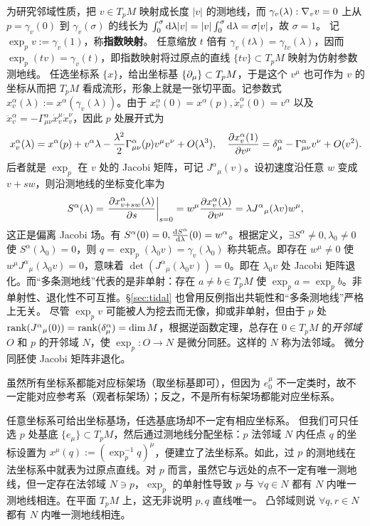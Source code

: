 为研究邻域性质，把 $v\in T_p M$ 映射成长度 $|v|$ 的测地线，而 $\gamma_v(\lambda) : \nabla_v v = 0$ 上从 $p=\gamma_v(0)$ 到 $\gamma_v(\sigma)$ 的线长为 $\int_0^\sigma\dd\lambda|v| = |v|\int_0^\sigma\dd\lambda = \sigma|v|$，故 $\sigma=1$。
记 $\exp_p v := \gamma_v(1)$，称\textbf{指数映射}。
任意缩放 $t$ 倍有 $\gamma_v(t\lambda) = \gamma_{t v}(\lambda)$，因而 $\exp_p(t v) = \gamma_v(t)$，即指数映射将过原点的直线 $\{t v\}\subset T_p M$ 映射为仿射参数测地线。
任选坐标系 $\{x\}$，给出坐标基 $\{\partial_\mu\}\subset T_p M$，于是这个 $v^\mu$ 也可作为 $v$ 的坐标从而把 $T_p M$ 看成流形，形象上就是一张切平面。记参数式 $x^\alpha_v(\lambda):=x^\alpha(\gamma_v(\lambda))$。由于 $x^\alpha_v(0)=x^\alpha(p),\dot x^\alpha_v(0)=v^\alpha$ 以及 $\ddot x^\alpha_v = -\Gamma^\alpha_{\mu\nu}\dot x^\mu_v\dot x^\nu_v$，因此 $p$ 处展开式为
\[
    x^\alpha_v(\lambda) = x^\alpha(p) + v^\alpha\lambda - \frac{\lambda^2}{2} \Gamma^\alpha_{\mu\nu}(p)v^\mu v^\nu + O(\lambda^3),\quad \pdv{x^\alpha_v(1)}{v^\mu} = \delta^\alpha_\mu - \Gamma^\alpha_{\mu\nu}v^\nu + O(v^2).
\]
后者就是 $\exp_p$ 在 $v$ 处的 Jacobi 矩阵，可记 $J^\alpha{}_\mu(v)$。设初速度沿任意 $w$ 变成 $v+s w$，则沿测地线的坐标变化率为
\[
    S^\alpha(\lambda) = \eval{\pdv{x^\alpha_{v+sw}(\lambda)}{s}}_{s=0} = w^\mu\pdv{x^\alpha_v(\lambda)}{v^\mu} = \lambda J^\alpha{}_\mu(\lambda v)w^\mu,
\]
这正是偏离 Jacobi 场。有 $S^\alpha(0) = 0,{\dv{S^\alpha}{\lambda}}(0) = w^\alpha$。根据定义，$\exists S^\alpha\ne 0,\lambda_0\ne 0$ 使 $S^\alpha(\lambda_0)=0$，则 $q=\exp_p(\lambda_0 v) = \gamma_v(\lambda_0)$ 称共轭点。即存在 $w^\mu\ne 0$ 使 $w^\mu J^\alpha{}_\mu(\lambda_0 v) = 0$，意味着 $\det(J^\alpha{}_\mu(\lambda_0 v)) = 0$。即在 $\lambda_0 v$ 处 Jacobi 矩阵退化。而“多条测地线”代表的是非单射：存在 $a\ne b\in T_p M$ 使 $\exp_p a=\exp_p b$。非单射性、退化性不可互推。\S\ref{sec:tidal} 也曾用反例指出共轭性和“多条测地线”严格上无关。
尽管 $\exp_p v$ 可能被人为挖去而无像，抑或非单射，但由于 $p$ 处$\rank(J^\alpha{}_\mu(0))=\rank(\delta^\alpha_\mu)=\dim M$，根据逆函数定理，总存在 $0\in T_p M$ 的\emph{开邻域} $O$ 和 $p$ 的开邻域 $N$，使 $\exp_p:O\to N$ 是微分同胚。这样的 $N$ 称为法邻域。
微分同胚使 Jacobi 矩阵非退化。


虽然所有坐标系都能对应标架场（取坐标基即可），但因为 $e_0^\mu$ 不一定类时，故不一定能对应参考系（观者标架场）；反之，不是所有标架场都能对应坐标系。

任意坐标系可给出坐标基场，任选基底场却不一定有相应坐标系。
但我们可只任选 $p$ 处基底 $\{e_\mu\}\subset T_p M$，然后通过测地线分配坐标：$p$ 法邻域 $N$ 内任点 $q$ 的坐标设置为 $x^\mu(q):=(\exp_p^{-1}q)^\mu$，便建立了法坐标系。如此，过 $p$ 的测地线在法坐标系中就表为过原点直线。对 $p$ 而言，虽然它与远处的点不一定有唯一测地线，但一定存在法邻域 $N\ni p$，$\exp_p$ 的单射性导致 $p$ 与 $\forall q\in N$ 都有 $N$ 内唯一测地线相连。在平面 $T_p M$ 上，这无非说明 $p,q$ 直线唯一。
凸邻域则说 $\forall q,r\in N$ 都有 $N$ 内唯一测地线相连。

